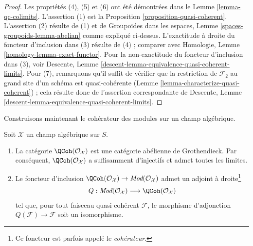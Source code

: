 \begin{proof}
Les propriétés (4), (5) et (6) ont été démontrées dans le
Lemme \ref{lemma-qc-colimits}.
L'assertion (1) est la
Proposition \ref{proposition-quasi-coherent}.
L'assertion (2) résulte de (1) et de
Groupoïdes dans les espaces, Lemme \ref{spaces-groupoids-lemma-abelian}
comme expliqué ci-dessus. L'exactitude à droite du foncteur d'inclusion
dans (3) résulte de (4) ; comparer avec
Homologie, Lemme \ref{homology-lemma-exact-functor}.
Pour la non-exactitude du foncteur d'inclusion dans (3), voir
Descente, Lemme \ref{descent-lemma-equivalence-quasi-coherent-limits}.
Pour (7), remarquons qu'il suffit de vérifier que la restriction
de $\mathcal{F}_2$ au grand site d'un schéma est quasi-cohérente
(Lemme \ref{lemma-characterize-quasi-coherent}) ;
cela résulte donc de l'assertion correspondante de
Descente, Lemme \ref{descent-lemma-equivalence-quasi-coherent-limits}.
\end{proof}

\noindent
Construisons maintenant le cohérateur des modules sur un champ algébrique.

\begin{proposition}
\label{proposition-coherator}
Soit $\mathcal{X}$ un champ algébrique sur $S$.
\begin{enumerate}
\item La catégorie $\QCoh(\mathcal{O}_\mathcal{X})$ est une catégorie
abélienne de Grothendieck. Par conséquent, $\QCoh(\mathcal{O}_\mathcal{X})$
a suffisamment d'injectifs et admet toutes les limites.
\item Le foncteur d'inclusion
$\QCoh(\mathcal{O}_\mathcal{X}) \to
\textit{Mod}(\mathcal{O}_\mathcal{X})$ admet un adjoint à droite\footnote{Ce
foncteur est parfois appelé le {\it cohérateur}.}
$$
Q :
\textit{Mod}(\mathcal{O}_\mathcal{X})
\longrightarrow
\QCoh(\mathcal{O}_\mathcal{X})
$$
tel que, pour tout faisceau quasi-cohérent $\mathcal{F}$, le morphisme d'adjonction
$Q(\mathcal{F}) \to \mathcal{F}$ soit un isomorphisme.
\end{enumerate}
\end{proposition}

